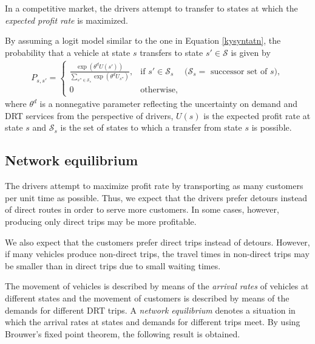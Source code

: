 \documentclass[dissertation,draft*]{aaltoseries}
\begin{document}
In a competitive market, the drivers attempt to transfer to
states at which the \emph{expected profit rate} is maximized. 

By assuming a logit model similar to the one in Equation \eqref{kysyntatn},
the probability that a vehicle at state $s$ transfers to state $s' \in \mathcal{S}$
is given by
\begin{align}
\label{transitionprobability}
P_{s,s'} = 
\left\{
\begin{array}{llr}
\frac{\exp(\theta^d U(s'))}{\sum_{s'' \in \mathcal{S}_{s}} \exp(\theta^d U_{s''})}, 
& \mbox{if } s' \in \mathcal{S}_s & (\mathcal{S}_s = \mbox{ successor set of $s$)}, \\
0 & \mbox{otherwise},&
\end{array}
\right.
\end{align}
where $\theta^d$ is a 
nonnegative parameter reflecting the uncertainty on
demand and DRT services from the perspective of drivers, $U(s)$ is the expected profit rate at state $s$ and 
$\mathcal{S}_s$ is the set of states to which a transfer from state $s$ is possible. 


\subsection{Network equilibrium}
\label{networkequilibrium}
The drivers attempt to maximize profit rate by 
transporting as many customers per unit time as possible. Thus, we expect that the
drivers prefer detours instead of direct routes in order to serve more 
customers.
In some cases, however, producing only direct trips may be more profitable. 

We also expect that the customers prefer direct trips instead of detours.
However, if many vehicles produce non-direct trips, 
the travel times in non-direct trips may be smaller than in direct trips due 
to small waiting times.

The movement of vehicles is described by means of the \emph{arrival rates}
of vehicles at different states and
the movement of customers is described by means of the demands 
for different DRT trips. 
A \emph{network equilibrium} denotes a situation in which the arrival rates at states and demands for different trips meet.
% 
By using Brouwer's fixed point theorem, the following result is obtained.
\end{document}
